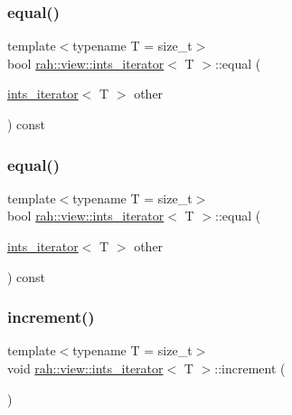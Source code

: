 \subsubsection{\texorpdfstring{equal()}{equal()}\hspace{0.1cm}{\footnotesize\ttfamily [1/2]}}
{\footnotesize\ttfamily template$<$typename T  = size\+\_\+t$>$ \\
bool \mbox{\hyperlink{structrah_1_1view_1_1ints__iterator}{rah\+::view\+::ints\+\_\+iterator}}$<$ T $>$\+::equal (\begin{DoxyParamCaption}\item[{\mbox{\hyperlink{structrah_1_1view_1_1ints__iterator}{ints\+\_\+iterator}}$<$ T $>$}]{other }\end{DoxyParamCaption}) const\hspace{0.3cm}{\ttfamily [inline]}}

\mbox{\label{structrah_1_1view_1_1ints__iterator_a5360257e3f004cd3cbbf14f779cace0b}} 
\subsubsection{\texorpdfstring{equal()}{equal()}\hspace{0.1cm}{\footnotesize\ttfamily [2/2]}}
{\footnotesize\ttfamily template$<$typename T  = size\+\_\+t$>$ \\
bool \mbox{\hyperlink{structrah_1_1view_1_1ints__iterator}{rah\+::view\+::ints\+\_\+iterator}}$<$ T $>$\+::equal (\begin{DoxyParamCaption}\item[{\mbox{\hyperlink{structrah_1_1view_1_1ints__iterator}{ints\+\_\+iterator}}$<$ T $>$}]{other }\end{DoxyParamCaption}) const\hspace{0.3cm}{\ttfamily [inline]}}

\mbox{\label{structrah_1_1view_1_1ints__iterator_a34e88e12edf3a728ee91c706749bd1c0}} 
\subsubsection{\texorpdfstring{increment()}{increment()}\hspace{0.1cm}{\footnotesize\ttfamily [1/2]}}
{\footnotesize\ttfamily template$<$typename T  = size\+\_\+t$>$ \\
void \mbox{\hyperlink{structrah_1_1view_1_1ints__iterator}{rah\+::view\+::ints\+\_\+iterator}}$<$ T $>$\+::increment (\begin{DoxyParamCaption}{ }\end{DoxyParamCaption})\hspace{0.3cm}{\ttfamily [inline]}}

